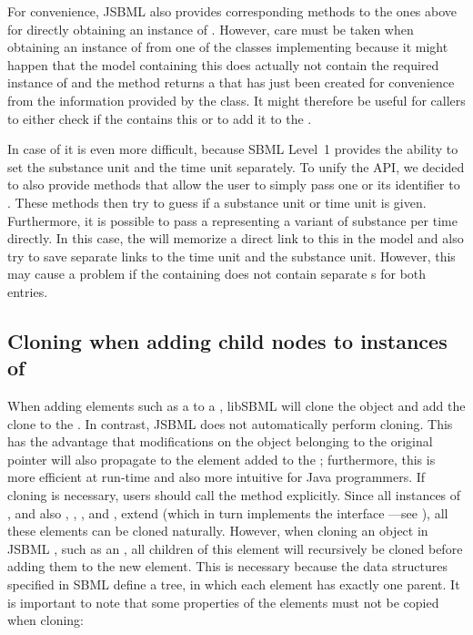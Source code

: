 
For convenience, JSBML also provides corresponding methods to the ones
above for directly obtaining an instance of \UnitDefinition.  However, care
must be taken when obtaining an instance of \UnitDefinition from one of the
classes implementing \SBaseWithUnit because it might happen that the
model containing this \SBaseWithUnit does actually not contain
the required instance of \UnitDefinition and the method returns a
 that has just been created for convenience from the
information provided by the class. It might therefore be useful for callers
to either check if the \Model{} contains this \UnitDefinition or to add it
to the \Model.

In case of \KineticLaw it is even more difficult, because SBML
Level~1 provides the ability to set the substance unit
and the time unit separately. To unify the API, we decided to also provide methods that
allow the user to simply pass one \UnitDefinition or its identifier to
\KineticLaw.  These methods then try to guess if a substance unit or time
unit is given. Furthermore, it is possible to pass a \UnitDefinition
representing a variant of substance per time directly. In this case, the
\KineticLaw will memorize a direct link to this \UnitDefinition in the
model and also try to save separate links to the time unit and
the substance unit. However, this may cause a problem if the containing
\Model does not contain separate \UnitDefinition{}s for both entries.


\subsection{Cloning when adding child nodes to instances of }

When adding elements such as a \Species to a \Model, libSBML 
will clone the object and add the clone to the \Model. In contrast, JSBML
does not automatically perform cloning. This has the advantage that
modifications on the object belonging to the original pointer will also
propagate to the element added to the \Model; furthermore, this is more
efficient at run-time and also more intuitive for Java programmers. If
cloning is necessary, users should call the  method
explicitly. Since all instances of \SBase, and also \Annotation, \ASTNode,
\CVTerm, and \History, extend \AbstractTreeNode (which in turn implements the
interface \Cloneable---see ), all these elements can
be cloned naturally.  However, when cloning an object in JSBML
, such as an \AbstractNamedSBase, all children of this element
will recursively be cloned before adding them to the new element. This is
necessary because the data structures specified in SBML
 define a tree, in which each element has
exactly one parent. It is important to note that some properties of the
elements must not be copied when cloning:

